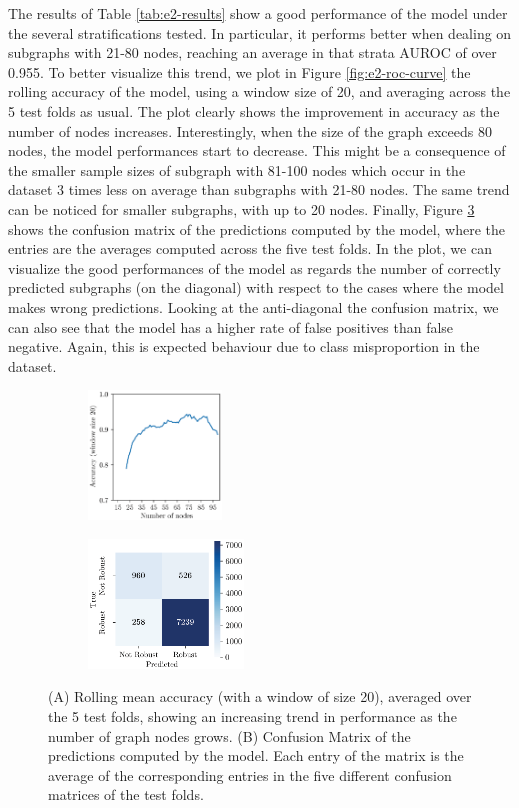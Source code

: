 The results of Table \ref{tab:e2-results} show a good performance of the model under the several stratifications tested. In particular, it performs better when dealing on subgraphs with 21-80 nodes, reaching an average in that strata AUROC of over 0.955. To better visualize this trend, we plot in Figure \ref{fig:e2-roc-curve} the rolling accuracy of the model, using a window size of 20, and averaging across the 5 test folds as usual. The plot clearly shows the improvement in accuracy as the number of nodes increases. Interestingly, when the size of the graph exceeds 80 nodes, the model performances start to decrease. This might be a consequence of the smaller sample sizes of subgraph with 81-100 nodes which occur in the dataset 3 times less on average than subgraphs with 21-80 nodes. The same trend can be noticed for smaller subgraphs, with up to 20 nodes. Finally, Figure \ref{fig:e2-conf-matrix} shows the confusion matrix of the predictions computed by the model, where the entries are the averages computed across the five test folds. In the plot, we can visualize the good performances of the model as regards the number of correctly predicted subgraphs (on the diagonal) with respect to the cases where the model makes wrong predictions. Looking at the anti-diagonal the confusion matrix, we can also see that the model has a higher rate of false positives than false negative. Again, this is expected behaviour due to class misproportion in the dataset.
\begin{figure}[h!]
    \begin{subfigure}[b]{0.48\linewidth}
    \centering
        \includegraphics[height=130px]{Figures/Chapter5/e2-rolling-acc.eps}
        \subcaption{}\label{fig:e2-rolling-acc}
    \end{subfigure}
    \begin{subfigure}[b]{0.48\linewidth}
        \centering
        \includegraphics[height=130px]{Figures/Chapter5/e2-conf-matrix.eps}
        \subcaption{}\label{fig:e2-conf-matrix}
    \end{subfigure}
    \caption{({\scriptsize A}) Rolling mean accuracy (with a window of size 20), averaged over the 5 test folds, showing an increasing trend in performance as the number of graph nodes grows. ({\scriptsize B}) Confusion Matrix of the predictions computed by the model. Each entry of the matrix is the average of the corresponding entries in the five different confusion matrices of the test folds.}
\end{figure}

